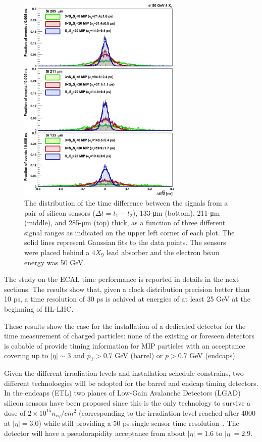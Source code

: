 \begin{figure}[h!]
  \centering
  \includegraphics[width = 0.7\textwidth]{figures/upgrade/hgcal_timing.png}
  \caption{The distribution of the time difference between the signals from a pair of silicon sensors ($\Delta t = t_1 - t_2$),
    133-μm (bottom), 211-μm (middle), and 285-μm (top) thick,
    as a function of three different signal ranges as indicated on the upper left corner of each plot.
    The solid lines represent Gaussian fits to the data points.
    The sensors were placed behind a $4X_9$ lead absorber and the electron beam energy was 50 GeV.~\cite{hgcal_time_tb}}
  \label{fig:hgcal_time_res}
\end{figure}
  
The study on the ECAL time performance is reported in details in the next sections. The results show that,
given a clock distribution precision better than 10 ps, a time resolution of 30 ps is achived at energies
of at least 25 GeV at the beginning of HL-LHC.

These results show the case for the installation of a dedicated detector for the time measurement of charged particles:
none of the existing or foreseen detectors is cabable of provide timing information for MIP particles with an
acceptance covering up to $|\eta|\sim 3$ and $p_T > 0.7$ GeV (barrel) or $p > 0.7$ GeV (endcaps).

Given the different irradiation levels and installation schedule constrains, two different
technoloegies will be adopted for the barrel and endcap timing detectors. In the endcaps (ETL) two planes of
Low-Gain Avalanche Detectors (LGAD) silicon sensors have been proposed since this is the only technology
to survive a dose of $2\times 10^{15} n_{eq}/cm^2$ 
(corresponding to the irradiation level reached after 4000 \fbinv at $|\eta|=3.0$)
while still providing a 50 ps single sensor time resolution~\cite{lgad1, lgad2}. The detector will have
a pseudorapidity acceptance from about $|\eta| = 1.6$ to $|\eta| = 2.9$.

